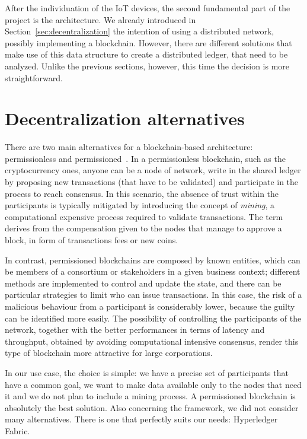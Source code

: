 After the individuation of the IoT devices, the second fundamental part of the project is the architecture. We already introduced in Section~\ref{sec:decentralization} the intention of using a distributed network, possibly implementing a blockchain. However, there are different solutions that make use of this data structure to create a distributed ledger, that need to be analyzed. Unlike the previous sections, however, this time the decision is more straightforward.

\section{Decentralization alternatives}
\label{sec:alternatives}
There are two main alternatives for a blockchain-based architecture: permissionless and permissioned~\cite{consensus_protocols}. In a permissionless blockchain, such as the cryptocurrency ones, anyone can be a node of network, write in the shared ledger by proposing new transactions (that have to be validated) and participate in the process to reach consensus. In this scenario, the absence of trust within the participants is typically mitigated by introducing the concept of \emph{mining}, a computational expensive process required to validate transactions. The term derives from the compensation given to the nodes that manage to approve a block, in form of transactions fees or new coins.

In contrast, permissioned blockchains are composed by known entities, which can be members of a consortium or stakeholders in a given business context; different methods are implemented to control and update the state, and there can be particular strategies to limit who can issue transactions. In this case, the risk of a malicious behaviour from a participant is considerably lower, because the guilty can be identified more easily. The possibility of controlling the participants of the network, together with the better performances in terms of latency and throughput, obtained by avoiding computational intensive consensus, render this type of blockchain more attractive for large corporations.

In our use case, the choice is simple: we have a precise set of participants that have a common goal, we want to make data available only to the nodes that need it and we do not plan to include a mining process. A permissioned blockchain is absolutely the best solution. Also concerning the framework, we did not consider many alternatives. There is one that perfectly suits our needs: Hyperledger Fabric. 

